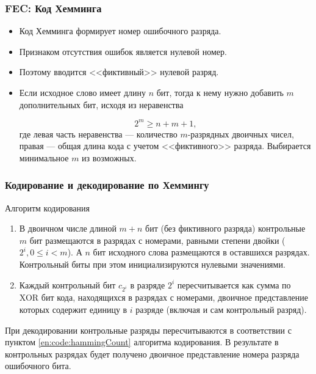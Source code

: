 \begin{frame}
    \frametitle{FEC: Код Хемминга}
    
    \begin{itemize}    
        \item Код Хемминга формирует номер ошибочного разряда. 
        \item Признаком отсутствия ошибок является нулевой номер. 
        \item Поэтому вводится <<фиктивный>> нулевой разряд. 
        \item Если исходное слово имеет длину $n$ бит, тогда к нему нужно добавить $m$ дополнительных бит, исходя из неравенства
        
        \begin{equation}
            \label{eq:code:hammingM}
            2^m\geq n + m + 1,
        \end{equation}
        где левая часть неравенства --- количество $m$-разрядных двоичных чисел, правая --- общая длина кода с учетом <<фиктивного>> разряда. Выбирается минимальное $m$ из возможных.
    \end{itemize}    
\end{frame}

\begin{frame}
    \frametitle{Кодирование и декодирование по Хеммингу}
    
    Алгоритм кодирования
    \begin{enumerate}
        \item В двоичном числе длиной $m+n$ бит (без фиктивного разряда) контрольные $m$ бит размещаются в разрядах с номерами, равными степени двойки ($2^i,0\leq i<m$). А $n$ бит исходного слова размещаются в оставшихся разрядах. Контрольный биты при этом инициализируются нулевыми значениями.
        
        \item\label{en:code:hammingCount} Каждый контрольный бит $c_{2^i}$ в разряде $2^i$ пересчитывается как сумма по XOR бит кода, находящихся в разрядах с номерами, двоичное представление которых содержит единицу в $i$ разряде (включая и сам контрольный разряд).
    \end{enumerate}
    
    При декодировании контрольные разряды пересчитываются в соответствии с пунктом \ref{en:code:hammingCount} алгоритма кодирования. В результате в контрольных разрядах будет получено двоичное представление номера разряда ошибочного бита.
\end{frame}

